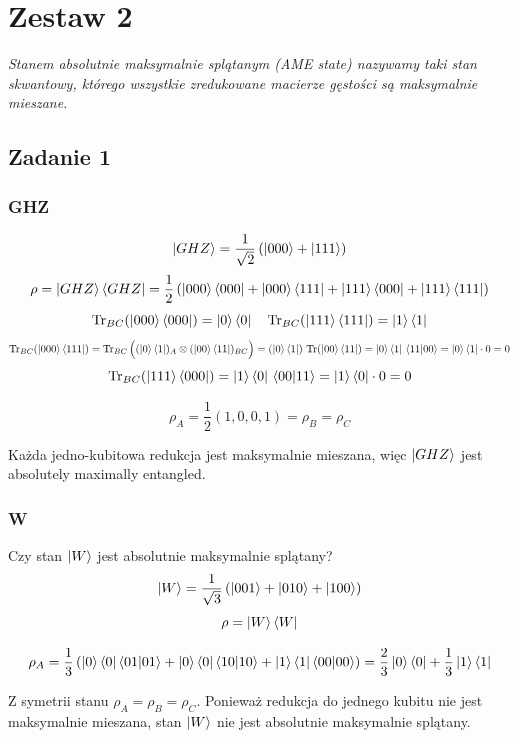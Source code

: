 \documentclass{../notatki}
\begin{document}
\section{Zestaw 2}

\textit{
  Stanem absolutnie maksymalnie splątanym (AME state) nazywamy taki
  stan skwantowy, którego wszystkie zredukowane macierze gęstości są
  maksymalnie mieszane.
}

\subsection{Zadanie 1}

\subsubsection{GHZ}

$$
\ket{GHZ} = \frac{1}{\sqrt{2}} \left(\ket{000} + \ket{111}\right)
$$
$$
\rho = \ket{GHZ} \bra{GHZ} = \frac{1}{2} \left(\ket{000} \bra{000} +
\ket{000} \bra{111} + \ket{111} \bra{000} + \ket{111} \bra{111}\right)
$$
$$
\Tr_{BC}(\ket{000}\bra{000}) = \ket{0}\bra{0} \quad
\Tr_{BC}(\ket{111}\bra{111}) = \ket{1}\bra{1}
$$
$$
\Tr_{BC}(\ket{000}\bra{111}) = \Tr_{BC}\Big( (\ket{0}\bra{1})_A
\otimes (\ket{00}\bra{11})_{BC} \Big)
=
(\ket{0}\bra{1})\,\Tr(\ket{00}\bra{11})
=
\ket{0}\bra{1}\,\braket{11}{00}
=
\ket{0}\bra{1}\cdot 0
=
0
$$
$$
\Tr_{BC}(\ket{111}\bra{000})
=
\ket{1}\bra{0}\,\braket{00}{11}
=
\ket{1}\bra{0}\cdot 0
=
0
$$

$$
\rho_A = \frac{1}{2}\left(1, 0, 0, 1\right) = \rho_B = \rho_C
$$

Każda jedno-kubitowa redukcja jest maksymalnie mieszana, więc
$\ket{GHZ}$ jest absolutely maximally entangled.

\subsubsection{W}

Czy stan $\ket{W}$ jest absolutnie maksymalnie splątany?
$$
\ket{W} = \frac{1}{\sqrt{3}}\left(\ket{001} + \ket{010} + \ket{100}\right)
$$
$$
\rho = \ket{W} \bra{W}
$$

$$
\rho_A = \frac{1}{3} \left(\ket{0}\bra{0} \braket{01}{01} +
  \ket{0}\bra{0} \braket{10}{10} + \ket{1}\bra{1}
\braket{00}{00}\right) = \frac{2}{3} \ket{0}\bra{0} + \frac{1}{3} \ket{1}\bra{1}
$$

Z symetrii stanu $\rho_A = \rho_B = \rho_C$. Ponieważ redukcja do jednego kubitu
nie jest maksymalnie mieszana, stan $\ket{W}$ nie jest absolutnie
maksymalnie splątany.
\end{document}
